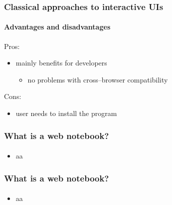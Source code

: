 \documentclass{beamer}
\begin{document}
\begin{frame}
    \frametitle{Classical approaches to interactive UIs}
    \framesubtitle{Advantages and disadvantages}

    {\color{MyGreen} Pros}:
    \begin{itemize}
        \item mainly benefits for developers
            \begin{itemize}
                \item no problems with cross--browser compatibility
            \end{itemize}
    \end{itemize}
    \pause
    {\color{red} Cons}:
    \begin{itemize}
        \item user needs to install the program
    \end{itemize}
\end{frame}

\begin{frame}
    \frametitle{What is a web notebook?}
    \framesubtitle{}

    \begin{itemize}
        \item aa
    \end{itemize}
\end{frame}

\begin{frame}
    \frametitle{What is a web notebook?}
    \framesubtitle{}

    \begin{itemize}
        \item aa
    \end{itemize}
\end{frame}
\end{document}

